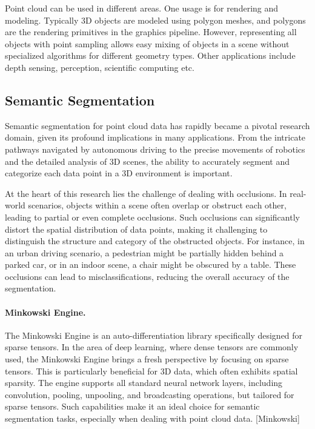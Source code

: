 \documentclass[11pt, a4paper,oneside,chapterprefix=false]{scrbook}
\begin{document}
Point cloud can be used in different areas. One usage is for rendering and modeling. Typically 3D objects are modeled using polygon meshes, and  polygons are the rendering primitives in the graphics pipeline. However, representing all objects with point sampling allows easy mixing of objects in a scene without specialized algorithms for different geometry types. Other applications include depth sensing, perception, scientific computing etc.

\subsection{Semantic Segmentation}

Semantic segmentation for point cloud data has rapidly became a pivotal research domain, given its profound implications in many applications. From the intricate pathways navigated by autonomous driving to the precise movements of robotics and the detailed analysis of 3D scenes, the ability to accurately segment and categorize each data point in a 3D environment is important.

\vspace{10pt}

At the heart of this research lies the challenge of dealing with occlusions. In real-world scenarios, objects within a scene often overlap or obstruct each other, leading to partial or even complete occlusions. Such occlusions can significantly distort the spatial distribution of data points, making it challenging to distinguish the structure and category of the obstructed objects. For instance, in an urban driving scenario, a pedestrian might be partially hidden behind a parked car, or in an indoor scene, a chair might be obscured by a table. These occlusions can lead to misclassifications, reducing the overall accuracy of the segmentation.


\paragraph{Minkowski Engine.}

The Minkowski Engine is an auto-differentiation library specifically designed for sparse tensors. In the area of deep learning, where dense tensors are commonly used, the Minkowski Engine brings a fresh perspective by focusing on sparse tensors. This is particularly beneficial for 3D data, which often exhibits spatial sparsity. The engine supports all standard neural network layers, including convolution, pooling, unpooling, and broadcasting operations, but tailored for sparse tensors. Such capabilities make it an ideal choice for semantic segmentation tasks, especially when dealing with point cloud data. [Minkowski]
\end{document}

